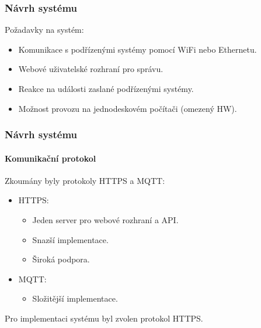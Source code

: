 \documentclass{beamer}
\begin{document}
  \begin{frame}
    \frametitle{Návrh systému}



      Požadavky na systém:

      \begin{itemize}
        \item Komunikace s podřízenými systémy pomocí WiFi nebo Ethernetu.
        \item Webové uživatelské rozhraní pro správu.
        \item Reakce na události zaslané podřízenými systémy.
        \item Možnost provozu na jednodeskovém počítači (omezený HW). %
      \end{itemize}
  \end{frame}

  \begin{frame}
    \frametitle{Návrh systému}
    \framesubtitle{Komunikační protokol}

    Zkoumány byly protokoly HTTPS a MQTT:

    \begin{itemize}
      \item HTTPS: 
      \begin{itemize}
        \item Jeden server pro webové rozhraní a API.
        \item Snazší implementace.
        \item Široká podpora.
      \end{itemize}
      \item MQTT:
      \begin{itemize}
        \item Složitější implementace.
      \end{itemize}
    \end{itemize}

    Pro implementaci systému byl zvolen protokol HTTPS.


  \end{frame}
\end{document}
